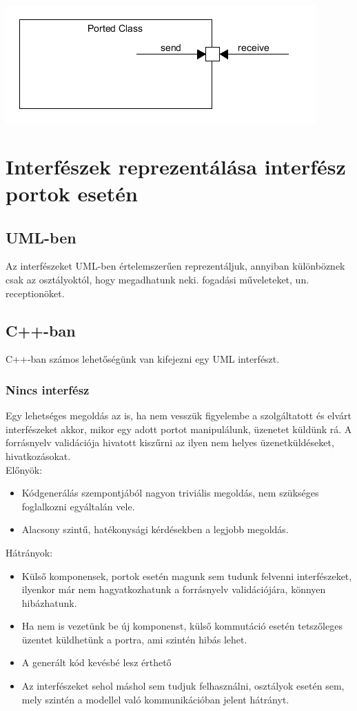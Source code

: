 \documentclass[a4paper,12pt]{report}
\begin{document}
\includegraphics[scale=0.8]{send_rec.png}

\section{Interfészek reprezentálása interfész portok esetén} \label{inf}
\subsection{UML-ben}
Az interfészeket UML-ben értelemszerűen reprezentáljuk, annyiban különböznek csak az osztályoktól, hogy megadhatunk neki. fogadási műveleteket, un. receptionöket.

\subsection{C++-ban}
C++-ban számos lehetőségünk van kifejezni egy UML interfészt.
\subsubsection{Nincs interfész}
Egy lehetséges megoldás az is, ha nem vesszük figyelembe a szolgáltatott és elvárt interfészeket akkor, mikor egy adott portot manipulálunk, üzenetet küldünk rá. A forrásnyelv validációja hivatott kiszűrni az ilyen nem helyes üzenetküldéseket, hivatkozásokat. \\
Előnyök:
\begin{itemize}
\item Kódgenerálás szempontjából nagyon triviális megoldás, nem szükséges foglalkozni egyáltalán vele.
\item Alacsony szintű, hatékonysági kérdésekben a legjobb megoldás. 
\end{itemize}
Hátrányok:
\begin{itemize}
\item Külső komponensek, portok esetén magunk sem tudunk felvenni interfészeket, ilyenkor már nem hagyatkozhatunk a forrásnyelv validációjára, könnyen hibázhatunk.
\item Ha nem is vezetünk be új komponenst, külső kommutáció esetén tetszőleges üzentet küldhetünk a portra, ami szintén hibás lehet.
\item A generált kód kevésbé lesz érthető
\item Az interfészeket sehol máshol sem tudjuk felhasználni, osztályok esetén sem, mely szintén a modellel való kommunikációban jelent hátrányt. 
\end{itemize}
\end{document}
